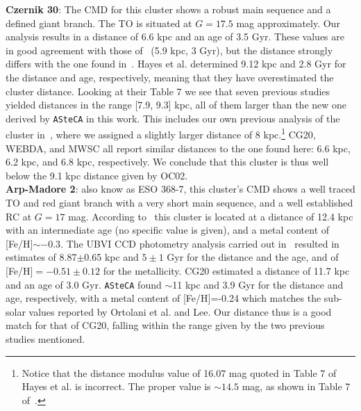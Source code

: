 \documentclass{aa}
\begin{document}
  \textbf{Czernik 30}: The CMD for this cluster shows a robust main sequence
  and a defined giant branch. The TO is situated at $G=17.5$ mag approximately.
  Our analysis results in a distance of 6.6 kpc and an age of 3.5 Gyr. These
  values are in good agreement with those of~\cite{Dias_2021} (5.9 kpc, 3 Gyr),
  but the distance strongly differs with the one found in~\cite{Hayes_2015}.
  Hayes et al. determined 9.12 kpc and 2.8 Gyr for the distance and age,
  respectively, meaning that they have overestimated the cluster distance.
  Looking at their Table 7 we see that seven previous studies yielded distances
  in the range [7.9, 9.3] kpc, all of them larger than the new one derived by
  \texttt{ASteCA} in this work. This includes our own previous analysis of the
  cluster in~\cite{Perren_2015}, where we assigned a slightly larger distance of
  8 kpc.\footnote{Notice that the distance modulus value of 16.07 mag quoted in
  Table 7 of Hayes et al. is incorrect. The proper value is $\sim14.5$ mag, as
  shown in Table 7 of~\cite{Perren_2015}.}
  CG20, WEBDA, and MWSC all report similar distances to the one found here:
  6.6 kpc, 6.2 kpc, and 6.8 kpc, respectively. We conclude that this cluster
  is thus well below the 9.1 kpc distance given by OC02.\\

  \textbf{Arp-Madore 2}: also know as ESO 368-7, this cluster's CMD shows
  a well traced TO and red giant branch with a very short main sequence, and a
  well established RC at $G=17$ mag.
  According to~\cite{Ortolani_1995} this cluster is located at a distance of
  12.4 kpc with an intermediate age (no specific value is given), and a metal
  content of [Fe/H]$\sim-0.3$.
  The UBVI CCD photometry analysis carried out in~\cite{Lee_1997} resulted in
  estimates of 8.87$\pm$0.65 kpc and $5\pm1$ Gyr for the distance and the age,
  and of [Fe/H]$=-0.51\pm0.12$ for the metallicity.
  CG20 estimated a distance of 11.7 kpc and an age of 3.0 Gyr.
  \texttt{ASteCA} found $\sim$11 kpc and 3.9 Gyr for the distance and
  age, respectively, with a metal content of [Fe/H]=-0.24 which matches the
  sub-solar values reported by Ortolani et al. and Lee.
  Our distance thus is a good match for that of CG20, falling within the range
  given by the two previous studies mentioned.\\
\end{document}
